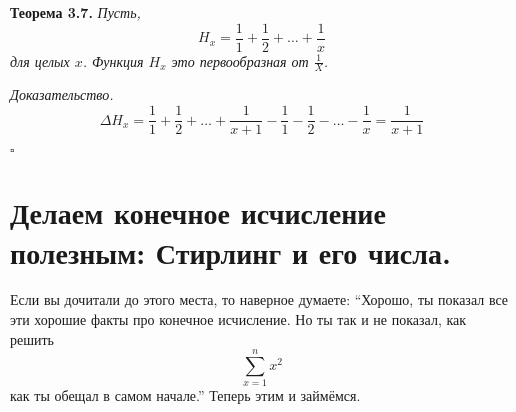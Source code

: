 \documentclass{article}
\begin{document}
\textbf{Теорема 3.7.} \textit{Пусть,}
$$H_x=\frac{1}{1}+\frac{1}{2}+\dots+\frac{1}{x}$$
\textit{для целых $x$. Функция $H_x$ это первообразная от $\frac{1}{X}$.}

\textit{Доказательство.} 
$$\Delta H_x=\frac{1}{1}+\frac{1}{2}+\dots+\frac{1}{x+1}-\frac{1}{1}-\frac{1}{2}-\dots-\frac{1}{x}=\frac{1}{x+1}$$

$\square$

\section{Делаем конечное исчисление полезным: Стирлинг и его числа.}
Если вы дочитали до этого места, то наверное думаете: ``Хорошо, ты показал все эти хорошие факты про конечное исчисление. Но ты так и не показал, как решить
$$\sum_{x=1}^n x^2$$
как ты обещал в самом начале.'' Теперь этим и займёмся.
\end{document}
